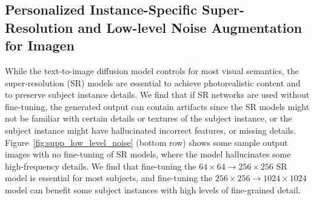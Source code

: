 \begin{table}[t]
\centering
{}
\caption{Effect of the number of input images on prompt fidelity (CLIP-T).
\label{table:number_images_clipt}}
\end{table}


\subsection*{Personalized Instance-Specific Super-Resolution and Low-level Noise Augmentation for Imagen}
While the text-to-image diffusion model controls for most visual semantics, the super-resolution (SR) models are essential to achieve photorealistic content and to preserve subject instance details. We find that if SR networks are used without fine-tuning, the generated output can contain artifacts since the SR models might not be familiar with certain details or textures of the subject instance, or the subject instance might have hallucinated incorrect features, or missing details. Figure~\ref{fig:supp_low_level_noise} (bottom row) shows some sample output images with no fine-tuning of SR models, where the model hallucinates some high-frequency details. We find that fine-tuning the $64\times 64 \rightarrow 256\times 256$ SR model is essential for most subjects, and fine-tuning the $256\times 256 \rightarrow 1024\times 1024$ model can benefit some subject instances with high levels of fine-grained detail.

